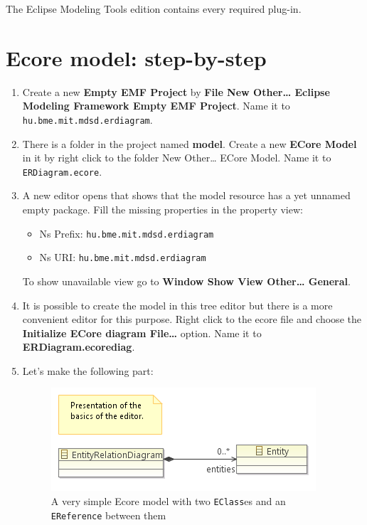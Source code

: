 \documentclass[]{report}
\let\Oldincludegraphics\includegraphics
\renewcommand{\includegraphics}[1]{
\begin{adjustbox}{max size={\textwidth}{\textheight}}
    \Oldincludegraphics[scale=0.6]{#1}%
\end{adjustbox}
}
\begin{document}
The Eclipse Modeling Tools edition contains every required plug-in.

\section{Ecore model: step-by-step}

\begin{enumerate}
\def\labelenumi{\arabic{enumi}.}
\item
  Create a new \textbf{Empty EMF Project} by \textbf{File \textbar{} New
  \textbar{} Other\ldots{} \textbar{} Eclipse Modeling Framework
  \textbar{} Empty EMF Project}. Name it to
  \texttt{hu.bme.mit.mdsd.erdiagram}.
\item
  There is a folder in the project named \textbf{model}. Create a new
  \textbf{ECore Model} in it by right click to the folder \textbar{} New
  \textbar{} Other\ldots{} \textbar{} ECore Model. Name it to
  \texttt{ERDiagram.ecore}.
\item
  A new editor opens that shows that the model resource has a yet
  unnamed empty package. Fill the missing properties in the property
  view:

  \begin{itemize}
  \itemsep1pt\parskip0pt
  \item
    Ns Prefix: \texttt{hu.bme.mit.mdsd.erdiagram}
  \item
    Ns URI: \texttt{hu.bme.mit.mdsd.erdiagram}
  \end{itemize}

  To show unavailable view go to \textbf{Window \textbar{} Show View
  \textbar{} Other\ldots{} \textbar{} General}.
\item
  It is possible to create the model in this tree editor but there is a
  more convenient editor for this purpose. Right click to the ecore file
  and choose the \textbf{Initialize ECore diagram File\ldots{}} option.
  Name it to \textbf{ERDiagram.ecorediag}.
\item
  Let's make the following part:

  \begin{figure}[htbp]
  \centering
  \includegraphics{img/emf/ERDiagram00.png}
  \caption{A very simple Ecore model with two \texttt{EClass}es and an
  \texttt{EReference} between them}
  \end{figure}


\end{enumerate}
\end{document}

